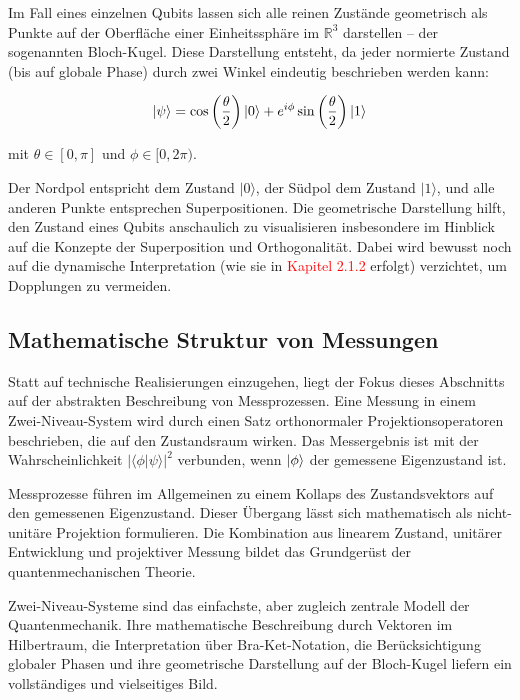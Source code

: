 Im Fall eines einzelnen Qubits lassen sich alle reinen Zustände geometrisch als Punkte auf der Oberfläche einer Einheitssphäre im $\mathbb{R}^3$ darstellen – der sogenannten Bloch-Kugel. Diese Darstellung entsteht, da jeder normierte Zustand (bis auf globale Phase) durch zwei Winkel eindeutig beschrieben werden kann:

\[
|\psi\rangle = \cos\left(\frac{\theta}{2}\right) \ket{0} + e^{i\phi} \sin\left(\frac{\theta}{2}\right) \ket{1}
\]

mit $\theta \in [0, \pi]$ und $\phi \in [0, 2\pi)$.

Der Nordpol entspricht dem Zustand $|0\rangle$, der Südpol dem Zustand $|1\rangle$, und alle anderen Punkte entsprechen Superpositionen. Die geometrische Darstellung hilft, den Zustand eines Qubits anschaulich zu visualisieren insbesondere im Hinblick auf die Konzepte der Superposition und Orthogonalität. Dabei wird bewusst noch auf die dynamische Interpretation (wie sie in \textcolor{red}{Kapitel 2.1.2} erfolgt) verzichtet, um Dopplungen zu vermeiden.

\subsection{Mathematische Struktur von Messungen}
\label{subsec: Mathematische Struktur von Messungen}

Statt auf technische Realisierungen einzugehen, liegt der Fokus dieses Abschnitts auf der abstrakten Beschreibung von Messprozessen. Eine Messung in einem Zwei-Niveau-System wird durch einen Satz orthonormaler Projektionsoperatoren beschrieben, die auf den Zustandsraum wirken. Das Messergebnis ist mit der Wahrscheinlichkeit $|\langle\phi|\psi\rangle|^2$ verbunden, wenn $\ket{\phi}$ der gemessene Eigenzustand ist.

Messprozesse führen im Allgemeinen zu einem Kollaps des Zustandsvektors auf den gemessenen Eigenzustand. Dieser Übergang lässt sich mathematisch als nicht-unitäre Projektion formulieren. Die Kombination aus linearem Zustand, unitärer Entwicklung und projektiver Messung bildet das Grundgerüst der quantenmechanischen Theorie.


Zwei-Niveau-Systeme sind das einfachste, aber zugleich zentrale Modell der Quantenmechanik. Ihre mathematische Beschreibung durch Vektoren im Hilbertraum, die Interpretation über Bra-Ket-Notation, die Berücksichtigung globaler Phasen und ihre geometrische Darstellung auf der Bloch-Kugel liefern ein vollständiges und vielseitiges Bild.

